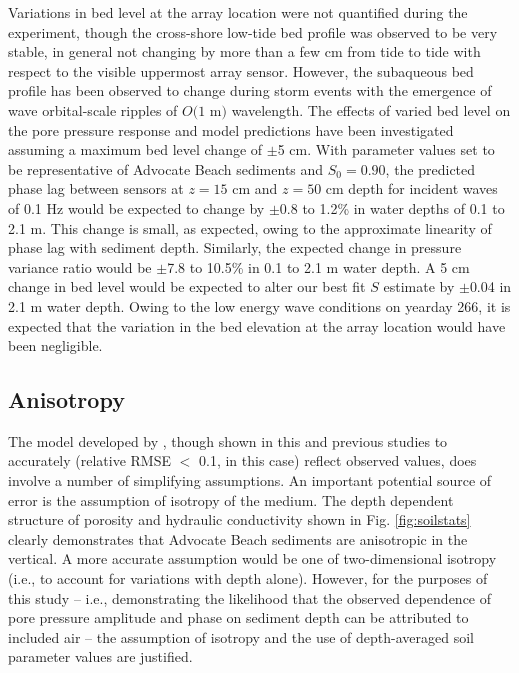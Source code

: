 Variations in bed level at the array location were not quantified during the experiment, though the cross-shore low-tide bed profile was observed to be very stable, in general not changing by more than a few cm from tide to tide with respect to the visible uppermost array sensor. However, the subaqueous bed profile has been observed \citep{Hay_etal2014} to change during storm events with the emergence of wave orbital-scale ripples of $O(1$ m$)$ wavelength. The effects of varied bed level on the pore pressure response and model predictions have been investigated assuming a maximum bed level change of $\pm$5 cm. With parameter values set to be representative of Advocate Beach sediments and $S_0=0.90$, the predicted phase lag between sensors at $z=15$ cm and $z=50$ cm depth for incident waves of 0.1 Hz would be expected to change by $\pm$0.8 to 1.2\% in water depths of 0.1 to 2.1 m. This change is small, as expected, owing to the approximate linearity of phase lag with sediment depth. Similarly, the expected change in pressure variance ratio would be $\pm$7.8 to 10.5\% in 0.1 to 2.1 m water depth. A 5 cm change in bed level would be expected to alter our best fit $S$ estimate by $\pm$0.04 in 2.1 m water depth. Owing to the low energy wave conditions on yearday 266, it is expected that the variation in the bed elevation at the array location would have been negligible. 

\subsection{Anisotropy}\label{Disc:Anisotropy}

The model developed by \citet{Yamamoto_etal1978}, though shown in this and previous studies to accurately (relative RMSE $<$ 0.1, in this case) reflect observed values, does involve a number of simplifying assumptions. An important potential source of error is the assumption of isotropy of the medium. The depth dependent structure of porosity and hydraulic conductivity shown in Fig. \ref{fig:soilstats} clearly demonstrates that Advocate Beach sediments are anisotropic in the vertical. A more accurate assumption would be one of two-dimensional isotropy (i.e., to account for variations with depth alone). However, for the purposes of this study -- i.e., demonstrating the likelihood that the observed dependence of pore pressure amplitude and phase on sediment depth can be attributed to included air -- the assumption of isotropy and the use of depth-averaged soil parameter values are justified.

